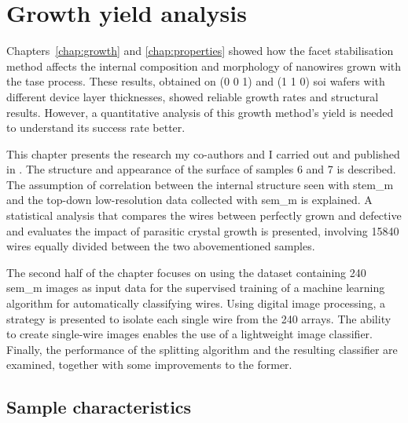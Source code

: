\chapter{Growth yield analysis}
\label{chap:yield_analysis}

Chapters~\ref{chap:growth} and \ref{chap:properties} showed how the  facet stabilisation method affects the internal composition and morphology of nanowires grown with the \acf{tase} process. These results, obtained on \hkl(0 0 1) and \hkl(1 1 0) \acf{soi} wafers with different device layer thicknesses, showed reliable growth rates and structural results. However, a quantitative analysis of this growth method's yield is needed to understand its success rate better. 

This chapter presents the research my co-authors and I carried out and published in \cite{Brugnolotto2023_2, Brugnolotto2024}. The structure and appearance of the surface of samples 6 and 7 is described. The assumption of correlation between the internal structure seen with \acf{stem_m} and the top-down low-resolution data collected with \acf{sem_m} is explained. A statistical analysis that compares the wires between perfectly grown and defective and evaluates the impact of parasitic crystal growth is presented, involving \num{15840} wires equally divided between the two abovementioned samples. 

The second half of the chapter focuses on using the dataset containing \num{240} \acs{sem_m} images as input data for the supervised training of a machine learning algorithm for automatically classifying wires. Using digital image processing, a strategy is presented to isolate each single wire from the \num{240} arrays. The ability to create single-wire images enables the use of a lightweight image classifier. Finally, the performance of the splitting algorithm and the resulting classifier are examined, together with some improvements to the former.

\section{Sample characteristics}

